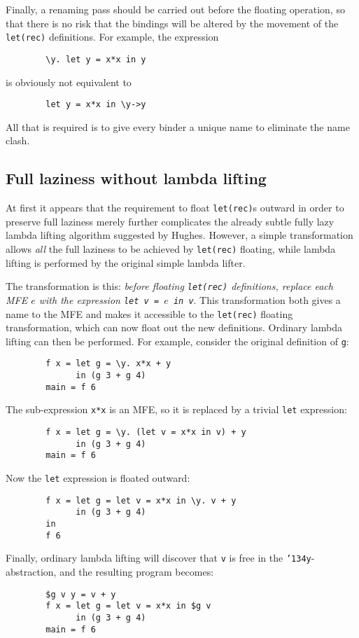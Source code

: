 Finally, a renaming pass should be carried out before the floating
operation, so that there is no risk that the bindings will be altered
by the movement of the \mbox{\tt let(rec)} definitions.  For example, the
expression
\begin{verbatim}
        \y. let y = x*x in y
\end{verbatim}
is obviously not equivalent to
\begin{verbatim}
        let y = x*x in \y->y
\end{verbatim}
All that is required is to give every binder a unique name to
eliminate the name clash.

\subsection{Full laziness without lambda lifting}

At first it appears that the requirement to float \mbox{\tt let(rec)}s outward in
order to preserve full laziness merely further complicates the already
subtle fully lazy lambda lifting algorithm suggested by Hughes.
However, a simple transformation allows {\em all\/} the full laziness to
be achieved by \mbox{\tt let(rec)} floating, while lambda lifting is performed by
the original simple lambda lifter.

The transformation is this: {\em before floating \mbox{\tt let(rec)} definitions,
replace each MFE $e$ with the expression \mbox{\tt let\ v\ =\ }$e$\mbox{\tt \ in\ v}}.  This
transformation both gives a name to the MFE and makes it accessible to
the \mbox{\tt let(rec)} floating transformation, which can now float out the new
definitions.  Ordinary lambda lifting can then be performed.  For
example, consider the original definition of \mbox{\tt g}:
\begin{verbatim}
        f x = let g = \y. x*x + y
              in (g 3 + g 4)
        main = f 6
\end{verbatim}
The sub-expression \mbox{\tt x*x} is an MFE, so it
is replaced by a trivial \mbox{\tt let} expression:
\begin{verbatim}
        f x = let g = \y. (let v = x*x in v) + y
              in (g 3 + g 4)
        main = f 6
\end{verbatim}
Now the \mbox{\tt let} expression is floated outward:
\begin{verbatim}
        f x = let g = let v = x*x in \y. v + y
              in (g 3 + g 4)
        in
        f 6
\end{verbatim}
Finally, ordinary lambda lifting will discover that \mbox{\tt v} is free in the
\mbox{\tt {\char'134}y}-abstraction, and the resulting program becomes:
\begin{verbatim}
        $g v y = v + y
        f x = let g = let v = x*x in $g v
              in (g 3 + g 4)
        main = f 6
\end{verbatim}

